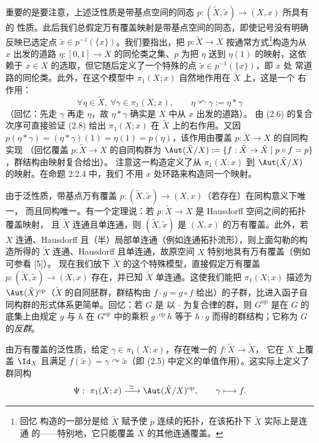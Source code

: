 重要的是要注意，上述泛性质是带基点空间的同态 $p:(\tilde X,\tilde x)\to(X,x)$ 所具有的
性质。此后我们总假定万有覆盖映射是带基点空间的同态，即使记号没有明确反映已选定点
$\tilde x\in p^{-1}(\{x\})$。我们要指出，把 $p:\tilde X\to X$ 按通常方式\footnote{回忆
构造的一部分是给 $\tilde X$ 赋予使 $p$ 连续的拓扑，在该拓扑下 $\tilde X$ 实际上是连通
的——特别地，它只能覆盖 $X$ 的其他连通覆盖。}构造为从 $x$ 出发的道路
$\eta:[0,1]\to X$ 的同伦类之集、$p$ 为把 $\eta$ 送到 $\eta(1)$ 的映射，这依赖于
$x\in X$ 的选取，但它随后定义了一个特殊的点 $\tilde x\in p^{-1}(\{x\})$，即 $x$ 处
常道路的同伦类。此外，在这个模型中 $\pi_1(X;x)$ 自然地作用在 $\tilde X$ 上，这是一个
右作用：
\begin{equation}\label{eq:2.8}
\forall\eta\in\tilde X,\ \forall\gamma\in\pi_1(X;x),\qquad
\eta\curvearrowleft\gamma:=\eta*\gamma
\end{equation}
（回忆：先走 $\gamma$ 再走 $\eta$，故 $\eta*\gamma$ 确实是 $X$ 中从 $x$ 出发的道路）。
由 (2.6) 的复合次序可直接验证 (2.8) 给出 $\pi_1(X;x)$ 在 $\tilde X$ 上的右作用。又因
$p(\eta*\gamma)=(\eta*\gamma)(1)=\eta(1)=p(\eta)$，该作用由覆盖 $p:\tilde X\to X$ 的自同构实现
（回忆覆盖 $p:\tilde X\to X$ 的自同构群为 $\Aut(\tilde X/X):=\{f:\tilde X\to\tilde X\mid p\circ f=p\}$，群结构由映射复合给出）。
注意这一构造定义了从 $\pi_1(X;x)$ 到 $\Aut(\tilde X/X)$ 的映射。在命题 2.2.4 中，我们
不用 $x$ 处环路来构造同一个映射。

由于泛性质，带基点万有覆盖 $p:(\tilde X,\tilde x)\to(X,x)$（若存在）在同构意义下唯一，
而且同构唯一。有一个定理说：若 $p:\tilde X\to X$ 是 Hausdorff 空间之间的拓扑覆盖映射，
且 $\tilde X$ 连通且单连通，则 $(\tilde X,\tilde x)$ 是 $(X,x)$ 的万有覆盖。此外，若 $X$
连通、Hausdorff 且（半）局部单连通（例如连通拓扑流形），则上面勾勒的构造所得的
$\tilde X$ 连通、Hausdorff 且单连通，故原空间 $X$ 特别地具有万有覆盖（例如可参看 [5]）。
现在我们放下 $\tilde X$ 的这个特殊模型，直接假定万有覆盖
$p:(\tilde X,\tilde x)\to(X,x)$ 存在，并已知 $\tilde X$ 单连通。这使我们能把
$\pi_1(X;x)$ 描述为 $\Aut(\tilde X)^{\mathrm{op}}$（$\tilde X$ 的自同胚群，群结构由
$f\cdot g=g\circ f$ 给出）的子群，比进入函子自同构群的形式体系更简单。回忆：若 $G$ 是
以 $\cdot$ 为复合律的群，则 $G^{\mathrm{op}}$ 是在 $G$ 的底集上由规定 $g$ 与 $h$ 在
$G^{\mathrm{op}}$ 中的乘积 $g\cdot^{\mathrm{op}}h$ 等于 $h\cdot g$ 而得的群结构；它称为
$G$ 的\emph{反群}。

\begin{proposition}\label{prop:2.2.4}
由万有覆盖的泛性质，给定 $\gamma\in\pi_1(X;x)$，存在唯一的 $f:\tilde X\to\tilde X$，
它在 $X$ 上覆盖 $\Id_X$ 且满足 $f(\tilde x)=\gamma\curvearrowright\tilde x$（即 (2.5)
中定义的单值作用）。这实际上定义了群同构
\begin{equation}\label{eq:2.9}
\Psi:\ \pi_1(X;x)\xrightarrow{\ \simeq\ }\Aut(\tilde X/X)^{\mathrm{op}},
\qquad \gamma\longmapsto f.
\end{equation}
\end{proposition}


